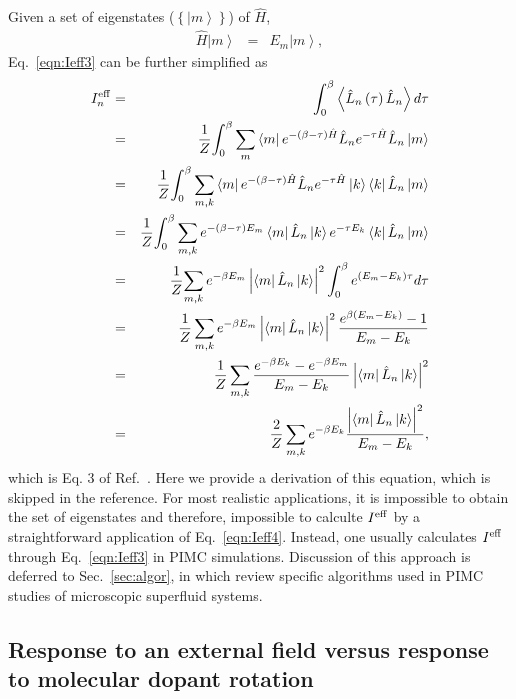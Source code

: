 \documentclass[12pt]{iopart}
\begin{document}
Given a set of eigenstates ($\left\{ \left| m \right> \right\}$) of $\hat{H}$,
\begin{eqnarray}
\hat{H}\left| m\right>&=&E_m\left| m\right>,
\end{eqnarray}
 Eq.~\ref{eqn:Ieff3} can be further simplified as
 \begin{eqnarray}
 I^{\rm eff}_n&=&\int_0^\beta \left< \hat{L}_n\left( \tau \right) \hat{L}_n \right> d\tau \nonumber\\
 &=&\frac{1}{Z}{\int_0^\beta \sum_m\left<m\right| e^{ -\left(\beta-\tau\right)\hat{H} }\hat{L}_n e^{ -\tau \hat{H} }\hat{L}_n\left|m\right>} \nonumber\\
 &=&\frac{1}{Z}{\int_0^\beta \sum_{m,k}\left<m\right| e^{ -\left(\beta-\tau\right)\hat{H} }\hat{L}_n e^{ -\tau \hat{H} }\left| k\right>\left<k\right|\hat{L}_n\left|m\right>} \nonumber\\
 &=&\frac{1}{Z}{\int_0^\beta \sum_{m,k} e^{-\left(\beta-\tau\right)E_m }\left<m\right|\hat{L}_n\left| k\right> e^{ -\tau E_k }\left<k\right|\hat{L}_n\left|m\right>}\nonumber\\
 &=&\frac{1}{Z}{\sum_{m,k} e^{ -\beta E_m }\left| \left< m \right|\hat{L}_n\left| k \right> \right|^2\int_0^\beta  e^{ \left(E_m-E_k \right)\tau }d\tau}\nonumber\\
 &=&\frac{1}{Z}\sum_{m,k} e^{ -\beta E_m }\left| \left< m \right|\hat{L}_n\left| k \right> \right|^2\frac{ e^{ \beta\left(E_m - E_k \right) }-1}{E_m - E_k}\nonumber\\
 &=&\frac{1}{Z}\sum_{m,k}\frac{ e^{ -\beta E_k }-e^{ -\beta E_m }}{E_m-E_k}\left| \left< m \right|\hat{L}_n\left| k \right> \right|^2  \nonumber\\
 &=&\frac{2}{Z}\sum_{m,k}e^{ -\beta E_k }\frac{\left|\left<m \right|\hat{L}_n\left|k \right> \right|^2}{E_m-E_k}, \label{eqn:Ieff4}
 \end{eqnarray}
 which is Eq. 3 of Ref.~\cite{Ieff_stringari}. Here we provide a derivation of this equation, which is skipped in the reference. For most realistic applications, it is impossible to obtain the set of eigenstates and therefore, impossible to calculte $I^{\rm eff}$ by a straightforward application of Eq.~\ref{eqn:Ieff4}. Instead, one usually calculates $I^{\rm eff}$ through Eq.~\ref{eqn:Ieff3} in PIMC simulations. Discussion of this approach is deferred to Sec.~\ref{sec:algor}, in which review specific algorithms used in PIMC studies of microscopic superfluid systems.
 
\subsection{Response to an external field versus response to molecular dopant rotation} \label{subsec:SFFvsMFF}
\end{document}
